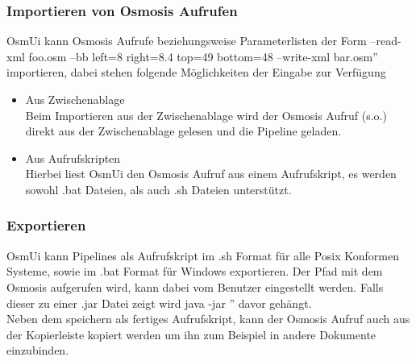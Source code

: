 \documentclass[a4paper,12pt]{scrartcl}
\begin{document}
\subsubsection{Importieren von Osmosis Aufrufen}
OsmUi kann Osmosis Aufrufe beziehungsweise Parameterlisten der Form \glqq --read-xml foo.osm --bb left=8 right=8.4 top=49 bottom=48 --write-xml bar.osm'' 
importieren, dabei stehen folgende Möglichkeiten der Eingabe zur Verfügung
\begin{itemize}
  \item Aus Zwischenablage\\
  Beim Importieren aus der Zwischenablage wird der Osmosis Aufruf (s.o.) direkt aus der Zwischenablage gelesen und die Pipeline geladen.
  \item Aus Aufrufskripten\\
  Hierbei liest OsmUi den Osmosis Aufruf aus einem Aufrufskript, es werden sowohl .bat Dateien, als auch .sh Dateien unterstützt.
\end{itemize}
\subsubsection{Exportieren}
OsmUi kann Pipelines als Aufrufskript im .sh Format für alle Posix Konformen Systeme, sowie im .bat Format für Windows exportieren.
Der Pfad mit dem Osmosis aufgerufen wird, kann dabei vom Benutzer eingestellt werden. Falls dieser zu einer .jar Datei zeigt wird \glqq java -jar '' davor
gehängt.\\ 
Neben dem speichern als fertiges Aufrufskript, kann der Osmosis Aufruf auch aus der Kopierleiste kopiert werden
um ihn zum Beispiel in andere Dokumente einzubinden. 
\end{document}
